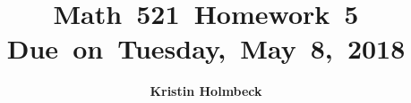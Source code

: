 


\newcommand{\hmwkTitle}{Homework\ 5} %
\newcommand{\hmwkDueDate}{Tuesday,\ May\ 8,\ 2018} %
\newcommand{\hmwkClass}{Math\ 521} %
\newcommand{\hmwkAuthorName}{Kristin Holmbeck} %


\title{
\textmd{\textbf{\hmwkClass \ \hmwkTitle}}\\
\normalsize\vspace{0.1in}\small{Due\ on\ \hmwkDueDate}\\
\vspace{0.1in}
\vspace{0.2in}
}

\author{\textbf{\hmwkAuthorName}}
\date{} %




\maketitle


\vspace{0.75in}
\tableofcontents
\listoffigures
\newpage



